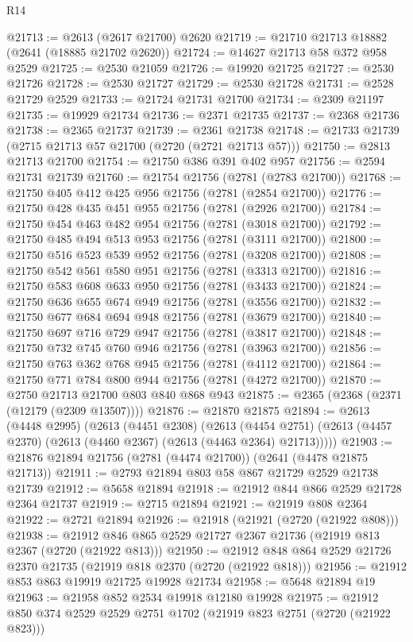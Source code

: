 \begin{lexlean}{R14}
\begin{coremodule}
@21713 := @2613 (@2617 @21700) @2620
@21719 := @21710 @21713 @18882 (@2641 (@18885 @21702 @2620))
@21724 := @14627 @21713 @58 @372 @958 @2529
@21725 := @2530 @21059
@21726 := @19920 @21725
@21727 := @2530 @21726
@21728 := @2530 @21727
@21729 := @2530 @21728
@21731 := @2528 @21729 @2529
@21733 := @21724 @21731 @21700
@21734 := @2309 @21197
@21735 := @19929 @21734
@21736 := @2371 @21735
@21737 := @2368 @21736
@21738 := @2365 @21737
@21739 := @2361 @21738
@21748 := @21733 @21739 (@2715 @21713 @57 @21700 (@2720 (@2721 @21713 @57)))
@21750 := @2813 @21713 @21700
@21754 := @21750 @386 @391 @402 @957
@21756 := @2594 @21731 @21739
@21760 := @21754 @21756 (@2781 (@2783 @21700))
@21768 := @21750 @405 @412 @425 @956 @21756 (@2781 (@2854 @21700))
@21776 := @21750 @428 @435 @451 @955 @21756 (@2781 (@2926 @21700))
@21784 := @21750 @454 @463 @482 @954 @21756 (@2781 (@3018 @21700))
@21792 := @21750 @485 @494 @513 @953 @21756 (@2781 (@3111 @21700))
@21800 := @21750 @516 @523 @539 @952 @21756 (@2781 (@3208 @21700))
@21808 := @21750 @542 @561 @580 @951 @21756 (@2781 (@3313 @21700))
@21816 := @21750 @583 @608 @633 @950 @21756 (@2781 (@3433 @21700))
@21824 := @21750 @636 @655 @674 @949 @21756 (@2781 (@3556 @21700))
@21832 := @21750 @677 @684 @694 @948 @21756 (@2781 (@3679 @21700))
@21840 := @21750 @697 @716 @729 @947 @21756 (@2781 (@3817 @21700))
@21848 := @21750 @732 @745 @760 @946 @21756 (@2781 (@3963 @21700))
@21856 := @21750 @763 @362 @768 @945 @21756 (@2781 (@4112 @21700))
@21864 := @21750 @771 @784 @800 @944 @21756 (@2781 (@4272 @21700))
@21870 := @2750 @21713 @21700 @803 @840 @868 @943
@21875 := @2365 (@2368 (@2371 (@12179 (@2309 @13507))))
@21876 := @21870 @21875
@21894 := @2613
    (@4448 @2995)
    (@2613
      (@4451 @2308)
      (@2613
        (@4454 @2751)
        (@2613 (@4457 @2370) (@2613 (@4460 @2367) (@2613 (@4463 @2364) @21713)))))
@21903 := @21876 @21894 @21756 (@2781 (@4474 @21700)) (@2641 (@4478 @21875 @21713))
@21911 := @2793 @21894 @803 @58 @867 @21729 @2529 @21738 @21739
@21912 := @5658 @21894
@21918 := @21912 @844 @866 @2529 @21728 @2364 @21737
@21919 := @2715 @21894
@21921 := @21919 @808 @2364
@21922 := @2721 @21894
@21926 := @21918 (@21921 (@2720 (@21922 @808)))
@21938 := @21912 @846 @865 @2529 @21727 @2367 @21736 (@21919 @813 @2367 (@2720 (@21922 @813)))
@21950 := @21912 @848 @864 @2529 @21726 @2370 @21735 (@21919 @818 @2370 (@2720 (@21922 @818)))
@21956 := @21912 @853 @863 @19919 @21725 @19928 @21734
@21958 := @5648 @21894 @19
@21963 := @21958 @852 @2534 @19918 @12180 @19928
@21975 := @21912 @850 @374 @2529 @2529 @2751 @1702 (@21919 @823 @2751 (@2720 (@21922 @823)))

\end{coremodule}
\end{lexlean}
